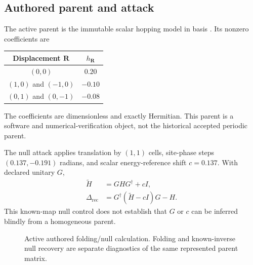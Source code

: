 \documentclass[11pt]{article}
\begin{document}
\subsection{Authored parent and attack}

The active parent is the immutable scalar hopping model
 in basis .  Its nonzero
coefficients are
\begin{center}
\begin{tabular}{cc}
\toprule
\textbf{Displacement $\mathbf R$} & \textbf{$h_{\mathbf R}$} \\
\midrule
$(0,0)$ & $0.20$ \\
$(1,0)$ and $(-1,0)$ & $-0.10$ \\
$(0,1)$ and $(0,-1)$ & $-0.08$ \\
\bottomrule
\end{tabular}
\end{center}
The coefficients are dimensionless and exactly Hermitian.  This parent is a software
and numerical-verification object, not the historical accepted periodic parent.

The null attack applies translation by $(1,1)$ cells, site-phase steps
$(0.137,-0.191)$ radians, and scalar energy-reference shift $c=0.137$.  With declared
unitary $G$,
\begin{align}
  \widetilde H &= GHG^\dagger+cI, \\
  \Delta_{\mathrm{rec}} &= G^\dagger(\widetilde H-cI)G-H.
\end{align}
This known-map null control does not establish that $G$ or $c$ can be inferred blindly
from a homogeneous parent.

\begin{figure}[htbp]
  \centering
  \caption{Active authored folding/null calculation.  Folding and known-inverse null
  recovery are separate diagnostics of the same represented parent matrix.}
  \label{fig:active-folding-null-schematic}
\end{figure}
\end{document}
